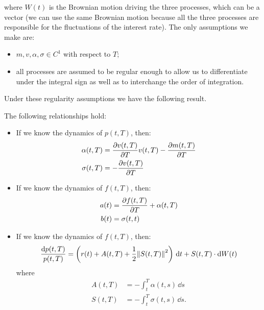 where $W(t)$ is the Brownian motion driving the three processes, which can be a vector (we can use the same Brownian motion because all the three processes are responsible for the fluctuations of the interest rate). The only assumptions we make are:
\begin{itemize}
    \item $m, v, \alpha, \sigma \in C^1$ with respect to $T$;
    \item all processes are assumed to be regular enough to allow us to differentiate under the integral sign as well as to interchange the order of integration.
\end{itemize}
Under these regularity assumptions we have the following result.
\begin{theorem}
    The following relationships hold:
    \begin{itemize}
        \item If we know the dynamics of $p(t,T)$, then:
        \begin{align}
            \alpha(t,T) &= \pdv{v(t,T)}{T}v(t,T) - \pdv{m(t,T)}{T} \\
            \sigma(t,T) &= -\pdv{v(t,T)}{T}
        \end{align}
        \item If we know the dynamics of $f(t,T)$, then:
        \begin{align}
            a(t) &= \pdv{f(t,T)}{T} + \alpha(t,T) \\
            b(t) &= \sigma(t,t)
        \end{align}
        \item If we know the dynamics of $f(t,T)$, then:
        \begin{align}
            \frac{\dd p(t,T)}{p(t,T)} = \left(r(t) + A(t,T) + \frac{1}{2}\norm{S(t,T)}^2\right)\,\dd t + S(t,T)\cdot \dd W(t)
        \end{align}
        where
        \begin{align}
            A(t,T) &= -\int_t^T \alpha(t,s)\,\dd s \\
            S(t,T) &= -\int_t^T \sigma(t,s)\,\dd s.
        \end{align}
    \end{itemize}
\end{theorem}

